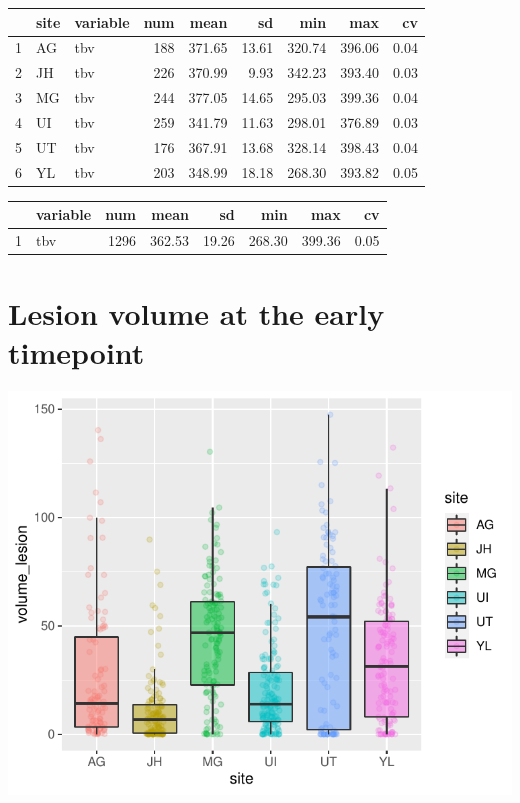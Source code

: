 \documentclass[
]{article}
\begin{document}
\begin{table}[ht]
\centering
\begin{tabular}{rllrrrrrr}
  \hline
 & site & variable & num & mean & sd & min & max & cv \\ 
  \hline
1 & AG & tbv & 188 & 371.65 & 13.61 & 320.74 & 396.06 & 0.04 \\ 
  2 & JH & tbv & 226 & 370.99 & 9.93 & 342.23 & 393.40 & 0.03 \\ 
  3 & MG & tbv & 244 & 377.05 & 14.65 & 295.03 & 399.36 & 0.04 \\ 
  4 & UI & tbv & 259 & 341.79 & 11.63 & 298.01 & 376.89 & 0.03 \\ 
  5 & UT & tbv & 176 & 367.91 & 13.68 & 328.14 & 398.43 & 0.04 \\ 
  6 & YL & tbv & 203 & 348.99 & 18.18 & 268.30 & 393.82 & 0.05 \\ 
   \hline
\end{tabular}
\end{table}
\begin{table}[ht]
\centering
\begin{tabular}{rlrrrrrr}
  \hline
 & variable & num & mean & sd & min & max & cv \\ 
  \hline
1 & tbv & 1296 & 362.53 & 19.26 & 268.30 & 399.36 & 0.05 \\ 
   \hline
\end{tabular}
\end{table}

\hypertarget{lesion-volume-at-the-early-timepoint}{%
\section{Lesion volume at the early
timepoint}\label{lesion-volume-at-the-early-timepoint}}

\begin{center}\includegraphics{paper_files/figure-latex/plot_lesion_early-1} \end{center}
\end{document}
